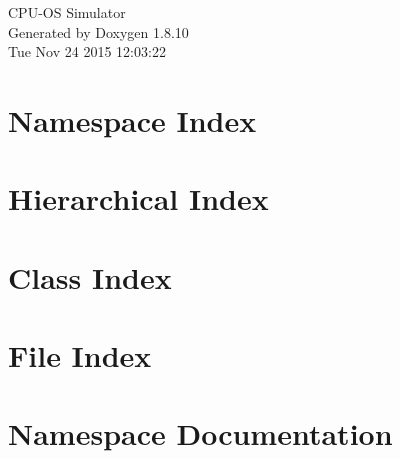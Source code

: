 \documentclass[twoside]{book}
\newcommand{\+}{\discretionary{\mbox{\scriptsize$\hookleftarrow$}}{}{}}
\newcommand{\clearemptydoublepage}{%
  \newpage{\pagestyle{empty}\cleardoublepage}%
}
\begin{document}
\hypersetup{pageanchor=false,
             bookmarks=true,
             bookmarksnumbered=true,
             pdfencoding=unicode
            }
\begin{titlepage}
\vspace*{7cm}
\begin{center}%
{\Large C\+P\+U-\/\+O\+S Simulator }\\
\vspace*{1cm}
{\large Generated by Doxygen 1.8.10}\\
\vspace*{0.5cm}
{\small Tue Nov 24 2015 12:03:22}\\
\end{center}
\end{titlepage}
\clearemptydoublepage
\tableofcontents
\clearemptydoublepage
{}
\hypersetup{pageanchor=true}

\chapter{Namespace Index}

\chapter{Hierarchical Index}

\chapter{Class Index}

\chapter{File Index}

\chapter{Namespace Documentation}







\end{document}
